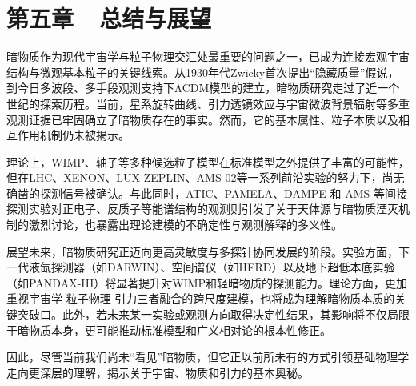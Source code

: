 \section*{第五章~~总结与展望}

\setcounter{section}{5} \setcounter{subsection}{0}
\setcounter{table}{0} \setcounter{figure}{0} \setcounter{equation}{0}

暗物质作为现代宇宙学与粒子物理交汇处最重要的问题之一，已成为连接宏观宇宙结构与微观基本粒子的关键线索。从1930年代Zwicky首次提出“隐藏质量”假说，到今日多波段、多手段观测支持下ΛCDM模型的建立，暗物质研究走过了近一个世纪的探索历程。当前，星系旋转曲线、引力透镜效应与宇宙微波背景辐射等多重观测证据已牢固确立了暗物质存在的事实。然而，它的基本属性、粒子本质以及相互作用机制仍未被揭示。

理论上，WIMP、轴子等多种候选粒子模型在标准模型之外提供了丰富的可能性，但在LHC、XENON、LUX-ZEPLIN、AMS-02等一系列前沿实验的努力下，尚无确凿的探测信号被确认。与此同时，ATIC、PAMELA、DAMPE 和 AMS 等间接探测实验对正电子、反质子等能谱结构的观测则引发了关于天体源与暗物质湮灭机制的激烈讨论，也暴露出理论建模的不确定性与观测解释的多义性。

展望未来，暗物质研究正迈向更高灵敏度与多探针协同发展的阶段。实验方面，下一代液氙探测器（如DARWIN）、空间谱仪（如HERD）以及地下超低本底实验（如PANDAX-III）将显著提升对WIMP和轻暗物质的探测能力。理论方面，更加重视宇宙学-粒子物理-引力三者融合的跨尺度建模，也将成为理解暗物质本质的关键突破口。此外，若未来某一实验或观测方向取得决定性结果，其影响将不仅局限于暗物质本身，更可能推动标准模型和广义相对论的根本性修正。

因此，尽管当前我们尚未“看见”暗物质，但它正以前所未有的方式引领基础物理学走向更深层的理解，揭示关于宇宙、物质和引力的基本奥秘。

\newpage